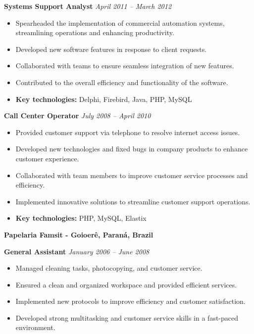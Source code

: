 \documentclass[12pt,a4paper,sans]{moderncv}        %
\begin{document}
\vspace{12pt}
\textbf{Systems Support Analyst} \hfill \textit{April 2011 -- March 2012}
\begin{itemize}
    \item Spearheaded the implementation of commercial automation systems, streamlining operations and enhancing productivity.
    \item Developed new software features in response to client requests.
    \item Collaborated with teams to ensure seamless integration of new features.
    \item Contributed to the overall efficiency and functionality of the software.
    \item \textbf{Key technologies:} Delphi, Firebird, Java, PHP, MySQL
\end{itemize}

\vspace{12pt}
\textbf{Call Center Operator} \hfill \textit{July 2008 -- April 2010}
\begin{itemize}
    \item Provided customer support via telephone to resolve internet access issues.
    \item Developed new technologies and fixed bugs in company products to enhance customer experience.
    \item Collaborated with team members to improve customer service processes and efficiency.
    \item Implemented innovative solutions to streamline customer support operations.
    \item \textbf{Key technologies:} PHP, MySQL, Elastix
\end{itemize}

\vspace{24pt}
\small{\textbf{Papelaria Famsit - Goioerê, Paraná, Brazil}}
\vspace{3pt}

\textbf{General Assistant} \hfill \textit{January 2006 -- June 2008}
\begin{itemize}
    \item Managed cleaning tasks, photocopying, and customer service.
    \item Ensured a clean and organized workspace and provided efficient services.
    \item Implemented new protocols to improve efficiency and customer satisfaction.
    \item Developed strong multitasking and customer service skills in a fast-paced environment.
\end{itemize}
\end{document}
